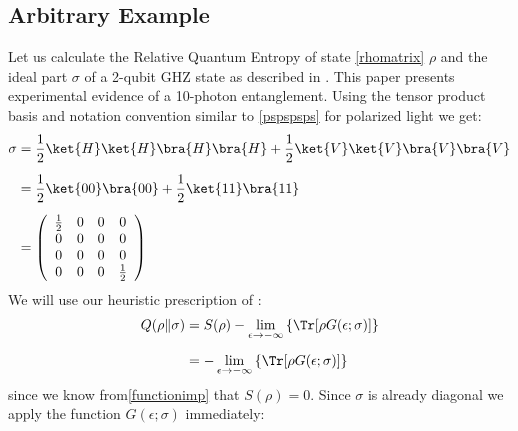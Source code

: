 \subsection{Arbitrary Example}
Let us calculate the Relative Quantum Entropy of state \eqref{rhomatrix} $\rho$ and the ideal part $\sigma$ of a 2-qubit GHZ state as described in \cite{tenphoton}. This paper presents experimental evidence of a 10-photon entanglement. Using the tensor product basis and notation convention similar to \eqref{pspspsps} for polarized light we get:
\begin{align}
\sigma &=\frac{1}{2}\ket{H}\ket{H}\bra{H}\bra{H}+\frac{1}{2}\ket{V}\ket{V} \bra{V} \bra{V} \\[0.5em]&=\frac{1}{2}\ket{00}\bra{00}+\frac{1}{2}\ket{11}\bra{11}
\\[0.5em] &= \left(
\begin{array}{cccc}
 \frac{1}{2} & 0 & 0 & 0 \\
 0 & 0 & 0 & 0 \\
 0 & 0 & 0 & 0 \\
 0 & 0 & 0 & \frac{1}{2} \\
\end{array}
\right)
\end{align}
We will use our heuristic prescription of :
\begin{align}
Q(\rho \| \sigma) &= S(\rho)-\lim_{\epsilon \to -\infty} \left\{ \Tr[\rho  G(\epsilon; \sigma)] \right\} \\[0.5em]
&=-\lim_{\epsilon \to -\infty} \left\{ \Tr[\rho  G(\epsilon; \sigma)] \right\}
\end{align}
since we know from\eqref{functionimp} that $S(\rho)=0$. Since $\sigma$ is already diagonal we apply the function $G(\epsilon;\sigma)$ immediately:
